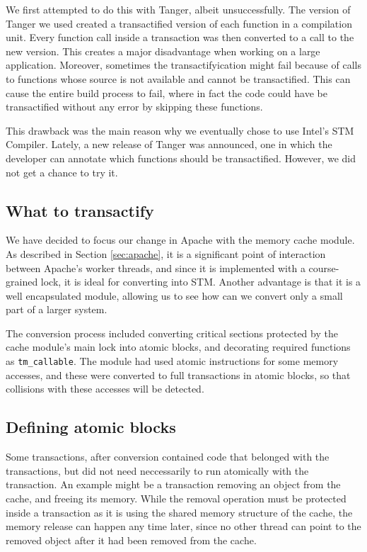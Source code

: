 \documentclass[preprint,11pt]{sigplanconf}
\begin{document}
We first attempted to do this with {\sc Tanger}, albeit unsuccessfully.
The version of {\sc Tanger} we used
created a transactified version of each function in a compilation
unit.  Every function call inside a transaction was then converted to a call to
the new version. This creates a major disadvantage when working on a large
application. Moreover, sometimes the
transactifyication might fail because of calls to functions whose source is not
available and cannot be transactified. This can cause the entire build process
to fail, where in fact the code could have be transactified without any error
by skipping these functions.

This drawback was the main reason why we eventually chose to use Intel's STM
Compiler. Lately, a new release of {\sc Tanger} was announced, one in which the developer
can annotate which functions should be transactified. However, we did not get a
chance to try it.

\subsection{What to transactify}
We have decided to focus our change in Apache with the memory cache module. As
described in Section \ref{sec:apache}, it is a significant point of interaction
between Apache's worker threads, and since it is implemented with a course-grained
lock, it is ideal for converting into STM. Another advantage is that it is a
well encapsulated module, allowing us to see how can we convert only a small
part of a larger system.

The conversion process included converting critical sections protected by the
cache module's main lock into atomic blocks, and decorating required functions
as {\tt tm\_callable}. The module had used atomic instructions for some memory
accesses, and these were converted to full transactions in atomic blocks, so
that collisions with these accesses will be detected.

\subsection{Defining atomic blocks}
Some transactions, after conversion contained code that belonged with the
transactions, but did not need neccessarily to run atomically with the
transaction. An example might be a transaction removing an object from the
cache, and freeing its memory. While the removal operation must be protected
inside a transaction as it is using the shared memory structure of the cache,
the memory release can happen any time later, since no other thread can point to
the removed object after it had been removed from the cache. 
\end{document}
